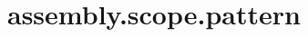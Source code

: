 \section{assembly.scope.pattern}
\label{configuration:AssemblyScopePattern}
\AvailableInCsharpOnly{\TODO}